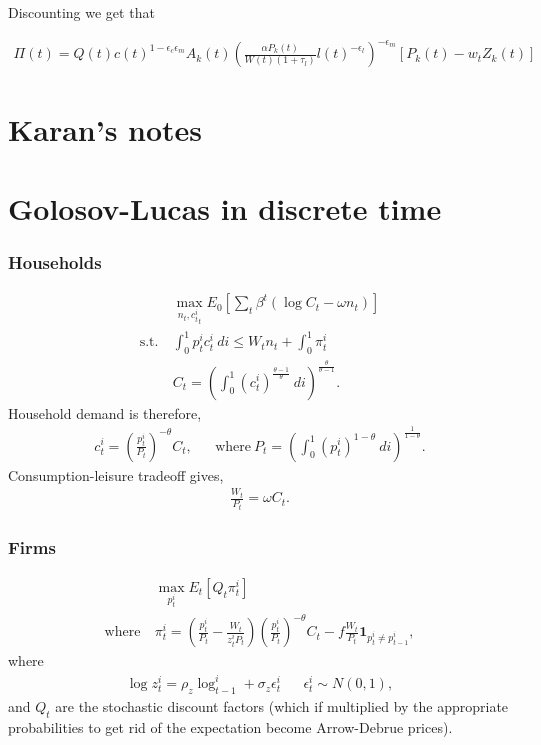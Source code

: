 Discounting we get that

\begin{align}
  \Pi(t) =  Q(t)c(t)^{1-\epsilon_c \epsilon_m} A_k(t) \left(   \frac{ \alpha P_k(t) }{W(t) (1+\tau_l)} l(t)^{-\epsilon_l} \right)^{- \epsilon_m}  \left[ P_k(t) - w_t Z_k(t) \right]
\end{align}


\section{Karan's notes}


\section{Golosov-Lucas in discrete time}

\subsubsection*{Households}
\begin{align*}
    & \max_{{n_t, c_t^i}_t} E_0 \left[ \sum_t \beta^t (\log C_t - \omega n_t) \right]\\
    \text{s.t.} \ & \int_0^1 p_t^ic_t^i \ di \leq W_t n_t + \int_0^1 \pi_t^i\\
    & C_t = \left( \int_0^1 (c_t^i)^{\frac{\theta - 1}{\theta}} \ di\right)^{\frac{\theta}{\theta - 1}}.
\end{align*}
Household demand is therefore,
\begin{align*}
     c_t^i = \left( \frac{p_t^i}{P_t}\right)^{-\theta} C_t, &&
    \text{where} \  P_t = \left( \int_0^1 (p_t^i)^{1-\theta} \ di\right)^{\frac{1}{1 - \theta}}.
\end{align*}
Consumption-leisure tradeoff gives,
\begin{align*}
    \frac{W_t}{P_t} = \omega C_t.
\end{align*}

\subsubsection*{Firms}
\begin{align*}
    & \max_{p^i_t} E_t \left[ Q_t \pi^i_t \right]\\
    \text{where} \ & \pi^i_t = \left( \frac{p^i_t}{P_t} - \frac{W_t}{z^i_t P_t} \right) \left( \frac{p_t^i}{P_t}\right)^{-\theta} C_t - f \frac{W_t}{P_t} \mathbf{1}_{p^i_t \neq p^i_{t-1}},
\end{align*}
where
\begin{align*}
    \log z^i_t = \rho_z \log ^i_{t-1} + \sigma_z \epsilon^i_t && \epsilon^i_t \sim N(0,1),
\end{align*}
and $Q_t$ are the stochastic discount factors (which if multiplied by the appropriate probabilities to get rid of the expectation become Arrow-Debrue prices).

